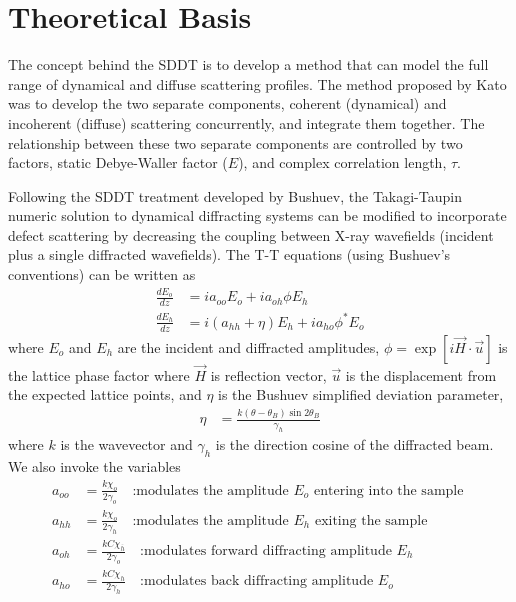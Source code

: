 	\section{Theoretical Basis}

The concept behind the SDDT is to develop a method that can model the full range of dynamical and diffuse scattering profiles.  The method proposed by Kato was to develop the two separate components, coherent (dynamical) and incoherent (diffuse) scattering concurrently, and integrate them together.  The relationship between these two separate components are controlled by two factors, static Debye-Waller factor ($E$), and complex correlation length, $\tau$.

Following the SDDT treatment developed by Bushuev, the Takagi-Taupin numeric solution to dynamical diffracting systems can be modified to incorporate defect scattering by decreasing the coupling between X-ray wavefields (incident plus a single diffracted wavefields).  The T-T equations (using Bushuev's conventions) can be written as
\begin{align}
\frac{dE_o}{dz} &= i a_{oo} E_o + ia_{oh} \phi E_h\\
\frac{dE_h}{dz} &= i(a_{hh}+\eta)E_h +i a_{ho}\phi^* E_o
\end{align}
where $E_o$ and $E_h$ are the incident and diffracted amplitudes, $\phi=\exp [i \vec{H} \cdot \vec{u}]$ is the lattice phase factor \cite{KatoI,Authier1} where $\vec{H}$ is reflection vector, $\vec{u}$ is the displacement from the expected lattice points, and $\eta$ is the Bushuev simplified deviation parameter,
\begin{align}
\eta &= \frac{k (\theta -\theta_B) \sin 2 \theta_B}{\gamma_h}
\end{align}
where $k$ is the wavevector and $\gamma_h$ is the direction cosine of the diffracted beam. We also invoke the variables
\begin{align}
a_{oo} &= \frac{k  \chi_o}{2 \gamma_o} \quad  \text{:modulates the amplitude $E_o$ entering into the sample }\\
a_{hh} &= \frac{k  \chi_o}{2 \gamma_h}\quad  \text{:modulates the amplitude $E_h$ exiting the sample }\\
a_{oh} &= \frac{k C \chi_{\overline{h}}}{2 \gamma_o}\quad \text{:modulates forward diffracting amplitude $E_h$}\\
a_{ho} &= \frac{k C \chi_h}{2 \gamma_h} \quad \text{:modulates back diffracting amplitude $E_o$}
\end{align}

